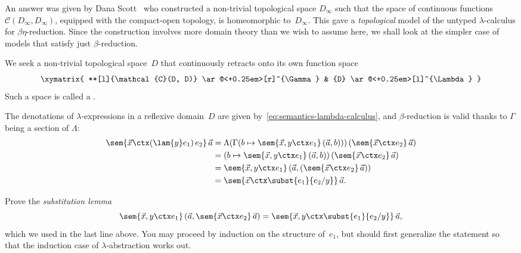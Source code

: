 An answer was given by Dana Scott~ who
constructed a non-trivial topological space $D_\infty$ such that the
space of continuous functions $\mathcal{C}(D_\infty, D_\infty)$,
equipped with the compact-open topology, is homeomorphic
to~$D_\infty$. This gave a \emph{topological} model of the untyped
$\lambda$-calculus for $\beta\eta$-reduction. Since the construction
involves more domain theory than we wish to assume here, we shall look
at the simpler case of models that satisfy just $\beta$-reduction.

We seek a non-trivial topological space~$D$ that continuously retracts onto its own function space
%
\begin{equation}
  \label{eq:section-retraction-D}
  \xymatrix{
    **[l]{\mathcal{C}(D, D)}
    \ar@<+0.25em>[r]^{\Gamma}
    &
    {D}
    \ar@<+0.25em>[l]^{\Lambda}
  }
\end{equation}
%
Such a space is called a .


The denotations of $\lambda$-expressions in a reflexive domain~$D$ are given by~\eqref{eq:semantics-lambda-calculus}, and $\beta$-reduction is valid thanks to $\Gamma$ being a section of $\Lambda$:
%
\begin{align*}
  \sem{\vec{x} \ctx (\lam{y} e_1) \, e_2} \, \vec{a}
  &= \Lambda(\Gamma(b \mapsto \sem{\vec{x}, y \ctx e_1} \, (\vec{a}, b))) 
     \, (\sem{\vec{x} \ctx e_2} \, \vec{a}) \\
  &= (b \mapsto \sem{\vec{x}, y \ctx e_1} \, (\vec{a}, b))
     \, (\sem{\vec{x} \ctx e_2} \, \vec{a}) \\
  &= \sem{\vec{x}, y \ctx e_1} \, (\vec{a}, (\sem{\vec{x} \ctx e_2} \, \vec{a})) \\
  &= \sem{\vec{x} \ctx \subst{e_1}{e_2/y}} \, \vec{a}.
\end{align*}

\begin{exercise}
  Prove the \emph{substitution lemma}
  \begin{equation*}
    \sem{\vec{x}, y \ctx e_1} \, (\vec{a}, \sem{\vec{x} \ctx e_2} \, \vec{a}) =
    \sem{\vec{x}, y \ctx \subst{e_1}{e_2/y}} \, \vec{a},
  \end{equation*}
  which we used in the last line above. You may proceed by induction on the structure of~$e_1$, but should first generalize the statement so that the induction case of $\lambda$-abstraction works out.
\end{exercise}

